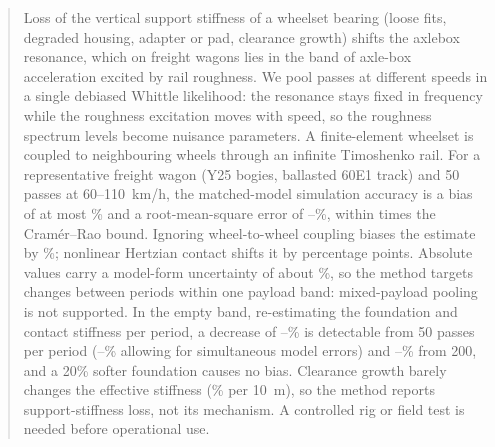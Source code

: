 \begin{abstract}
Loss of the vertical support stiffness of a wheelset bearing (loose fits, degraded housing, adapter or
pad, clearance growth) shifts the axlebox resonance, which on freight wagons lies in the band of
axle-box acceleration excited by rail roughness. We pool passes at different speeds in a single debiased
Whittle likelihood: the resonance stays fixed in frequency while the roughness excitation moves with
speed, so the roughness spectrum levels become nuisance parameters. A finite-element wheelset is coupled
to neighbouring wheels through an infinite Timoshenko rail. For a representative freight wagon (Y25
bogies, ballasted 60E1 track) and 50 passes at 60--110~km/h, the matched-model simulation accuracy is a
bias of at most \HLBiasAbsMax\% and a root-mean-square error of \HLRMSEMin--\HLRMSEMax\%, within
\HLRatioCRBMax{} times the Cram\'er--Rao bound. Ignoring wheel-to-wheel coupling biases the estimate by
\IgnoreCouplingForty\%; nonlinear Hertzian contact shifts it by \ICDiffMean{} percentage points. Absolute
values carry a model-form uncertainty of about \BudgetCoestInt\%, so the method targets changes between
periods within one payload band: mixed-payload pooling is not
supported. In the empty band, re-estimating the foundation and contact stiffness per period,
a decrease of \BandEmptyMDCFiftyMin--\BandEmptyMDCFiftyMax\% is detectable from 50 passes per period
(\BandEmptyMDCFiftyConsMin--\BandEmptyMDCFiftyConsMax\% allowing for simultaneous model errors) and
\BandEmptyMDCTwoHundredMin--\BandEmptyMDCTwoHundredMax\% from 200, and a 20\% softer foundation causes no
bias. Clearance growth barely changes the effective stiffness (\EffPctTenEmpty\% per 10~\textmu m), so
the method reports support-stiffness loss, not its mechanism. A controlled rig or field test is needed
before operational use.
\end{abstract}
